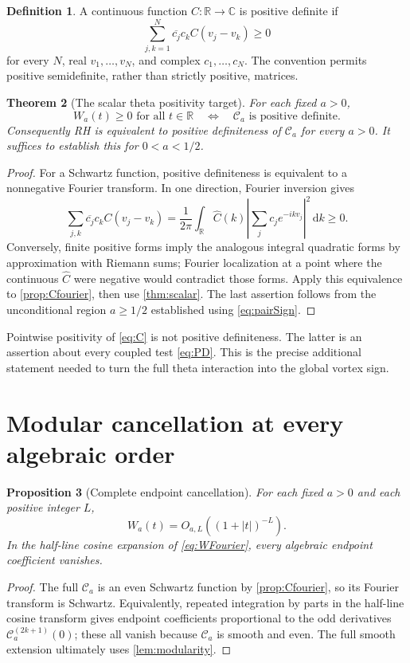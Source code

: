 \documentclass[11pt,letterpaper]{article}
\numberwithin{equation}{section}
\newtheorem{theorem}{Theorem}[section]
\newtheorem{proposition}[theorem]{Proposition}
\theoremstyle{definition}
\newtheorem{definition}[theorem]{Definition}
\theoremstyle{remark}
\newcommand{\R}{\mathbb R}
\newcommand{\C}{\mathbb C}
\newcommand{\dd}{\,\mathrm d}
\newcommand{\calC}{\mathcal C}
\begin{document}
\begin{definition}
A continuous function $C:\R\to\C$ is positive definite if
\begin{equation}\label{eq:PD}
\sum_{j,k=1}^N\overline{c_j}c_k C(v_j-v_k)\ge0
\end{equation}
for every $N$, real $v_1,\ldots,v_N$, and complex $c_1,\ldots,c_N$. The convention permits positive semidefinite, rather than strictly positive, matrices.
\end{definition}

\begin{theorem}[The scalar theta positivity target]\label{thm:Ccriterion}
For each fixed $a>0$,
\[
W_a(t)\ge0\text{ for all }t\in\R
\quad\Longleftrightarrow\quad
\calC_a\text{ is positive definite}.
\]
Consequently RH is equivalent to positive definiteness of $\calC_a$ for every $a>0$. It suffices to establish this for $0<a<1/2$.
\end{theorem}
\begin{proof}
For a Schwartz function, positive definiteness is equivalent to a nonnegative Fourier transform. In one direction, Fourier inversion gives
\[
\sum_{j,k}\overline{c_j}c_kC(v_j-v_k)
=\frac1{2\pi}\int_\R\widehat C(k)
\left|\sum_jc_je^{-ikv_j}\right|^2\dd k\ge0.
\]
Conversely, finite positive forms imply the analogous integral quadratic forms by approximation with Riemann sums; Fourier localization at a point where the continuous $\widehat C$ were negative would contradict those forms. Apply this equivalence to \cref{prop:Cfourier}, then use \cref{thm:scalar}. The last assertion follows from the unconditional region $a\ge1/2$ established using \eqref{eq:pairSign}.
\end{proof}

Pointwise positivity of \eqref{eq:C} is not positive definiteness. The latter is an assertion about every coupled test \eqref{eq:PD}. This is the precise additional statement needed to turn the full theta interaction into the global vortex sign.

\section{Modular cancellation at every algebraic order}\label{sec:cancellation}
\begin{proposition}[Complete endpoint cancellation]\label{prop:rapid}
For each fixed $a>0$ and each positive integer $L$,
\begin{equation}\label{eq:rapid}
W_a(t)=O_{a,L}((1+|t|)^{-L}).
\end{equation}
In the half-line cosine expansion of \eqref{eq:WFourier}, every algebraic endpoint coefficient vanishes.
\end{proposition}
\begin{proof}
The full $\calC_a$ is an even Schwartz function by \cref{prop:Cfourier}, so its Fourier transform is Schwartz. Equivalently, repeated integration by parts in the half-line cosine transform gives endpoint coefficients proportional to the odd derivatives $\calC_a^{(2k+1)}(0)$; these all vanish because $\calC_a$ is smooth and even. The full smooth extension ultimately uses \cref{lem:modularity}.
\end{proof}
\end{document}
